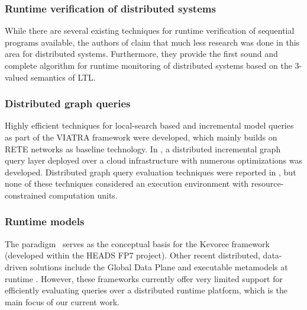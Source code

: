 \subsubsection{Runtime verification of distributed systems}
While there are several existing techniques for runtime verification of sequential programs available, the authors of \cite{Mostafa2015} claim that much less research was done in this area for distributed systems. Furthermore, they provide the first sound and complete algorithm for runtime monitoring of distributed systems based on the 3-valued semantics of LTL.

\subsubsection{Distributed graph queries}
Highly efficient techniques for local-search based \cite{icgt2015} and incremental model queries \cite{scp2015} as part of the VIATRA framework were developed, which mainly builds on RETE networks as baseline technology. In \cite{models2014-iqd}, a distributed incremental graph query layer deployed over a cloud infrastructure with numerous optimizations was developed. 
Distributed graph query evaluation techniques were reported in \cite{Mitschke2014,Peters2014,Krause2014}, but none of these techniques considered an execution environment with resource-constrained computation units.

\subsubsection{Runtime models} 
The \mrt paradigm~\cite{DBLP:journals/computer/BlairBF09} serves as the conceptual basis for the Kevoree framework~\cite{Morin2014} (developed within the HEADS FP7 project). Other recent distributed, data-driven solutions include the Global Data Plane \cite{Zhang2015} and executable metamodels at runtime \cite{Vogel2014}. However, these frameworks currently offer very limited support for efficiently evaluating queries over a distributed runtime platform, which is the main focus of our current work.







